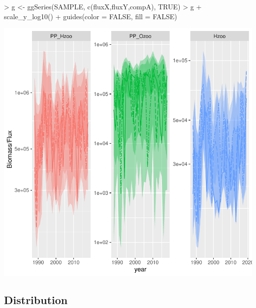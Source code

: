 \documentclass{article}
\begin{document}
\begin{Schunk}
\begin{Sinput}
> g <- ggSeries(SAMPLE, c(fluxX,fluxY,compA), TRUE)
> g + scale_y_log10() + guides(color = FALSE, fill = FALSE)
\end{Sinput}
\end{Schunk}
\includegraphics{barents_SM-017}

\clearpage

\subsection{Distribution}
\end{document}
